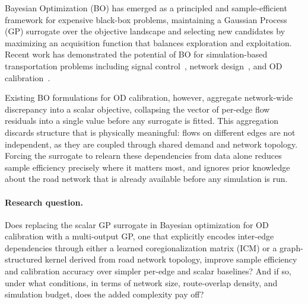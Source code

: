 \documentclass[11pt]{article}
\begin{document}
Bayesian Optimization (BO) has emerged as a principled and sample-efficient framework for expensive black-box problems, maintaining a Gaussian Process (GP) surrogate over the objective landscape and selecting new candidates by 
maximizing an acquisition function that balances exploration and exploitation. Recent work has demonstrated the potential of BO for 
simulation-based transportation problems including signal 
control~\parencite{tay2021bayesian}, 
network 
design~\parencite{yin2022bobb}, and OD 
calibration~\parencite{huo2023simulation}.


Existing BO formulations for OD calibration, however, aggregate
network-wide discrepancy into a scalar objective, collapsing the vector of per-edge flow residuals into a single value before any surrogate is fitted.
This aggregation discards structure that is physically meaningful: flows on different edges are not independent, as they are coupled through shared demand and network topology. Forcing the surrogate to relearn these
dependencies from data alone reduces sample efficiency precisely where it
matters most, and ignores prior knowledge about the road network that is
already available before any simulation is run.

\paragraph{Research question.}
Does replacing the scalar GP surrogate in Bayesian optimization for OD
calibration with a multi-output GP, one that explicitly encodes inter-edge
dependencies through either a learned coregionalization matrix (ICM) or a
graph-structured kernel derived from road network topology, improve sample
efficiency and calibration accuracy over simpler per-edge and scalar baselines?
And if so, under what conditions, in terms of network size, route-overlap
density, and simulation budget, does the added complexity pay off?
\end{document}
